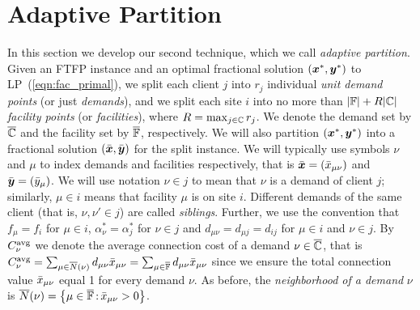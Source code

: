 \documentclass[11pt]{article}
\begin{document}
\section{Adaptive Partition}
\label{sec:adaptive partition}
In this section we develop our second technique, which we
call \emph{adaptive partition}. Given an FTFP instance and
an optimal fractional solution $(\boldsymbol{x}^\ast, \boldsymbol{y}^\ast)$ to
LP~(\ref{eqn:fac_primal}), we split each client $j$ into
$r_j$ individual \emph{unit demand points} (or just
\emph{demands}), and we split each site $i$ into no more
than $|\mathbb{F}|+R|\mathbb{C}|$ \emph{facility points} (or
\emph{facilities}), where $R=\max_{j\in\mathbb{C}}r_j$. We
denote the demand set by $\overline{\mathbb{C}}$ and the facility set
by $\overline{\mathbb{F}}$, respectively.  We will also partition
$(\boldsymbol{x}^\ast,\boldsymbol{y}^\ast)$ into a fractional solution
$(\bar{\boldsymbol{x}},\bar{\boldsymbol{y}})$ for the split instance.  We will
typically use symbols $\nu$ and $\mu$ to index demands and
facilities respectively, that is $\bar{\boldsymbol{x}} =
({\bar x}_{\mu\nu})$ and $\bar{\boldsymbol{y}} = ({\bar y}_{\mu})$.  We will
use notation $\nu\in j$ to mean that $\nu$ is a demand of
client $j$; similarly, $\mu\in i$ means that facility $\mu$
is on site $i$. Different demands of the same client (that
is, $\nu,\nu'\in j$) are called \emph{siblings}.  Further,
we use the convention that $f_\mu = f_i$ for $\mu\in i$,
$\alpha_\nu^\ast = \alpha_j^\ast$ for $\nu\in j$ and
$d_{\mu\nu} = d_{\mu j} = d_{ij}$ for $\mu\in i$ and $\nu\in
j$.  By $C^{{\mbox{\scriptsize\rm avg}}}_{\nu}$ we denote the average connection
cost of a demand $\nu\in\overline{\mathbb{C}}$, that is $C^{{\mbox{\scriptsize\rm avg}}}_{\nu}
=\sum_{\mu\in{\overline{N}}(\nu)}d_{\mu\nu}{\bar x}_{\mu\nu} =
\sum_{\mu\in\overline{\mathbb{F}}}d_{\mu\nu}{\bar x}_{\mu\nu}$ since we
ensure the total connection value ${\bar x}_{\mu\nu}$ equal 1
for every demand $\nu$.  As before, the \emph{neighborhood
  of a demand} $\nu$ is
${\overline{N}}(\nu)={ \left\{ \mu\in\overline{\mathbb{F}} {\,:\,}
  {\bar x}_{\mu\nu}>0 \right\} }$.
\end{document}
